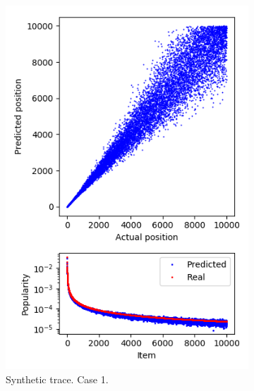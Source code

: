 \begin{figure}[t!]
	\centering
	\begin{subfigure}[b]{0.49\linewidth}
		\includegraphics[width=\linewidth]{pics/case1_op.png}
		\caption{Synthetic trace. Case 1.}
	\end{subfigure}
	\begin{subfigure}[b]{0.49\linewidth}

\end{subfigure}
\end{figure}

